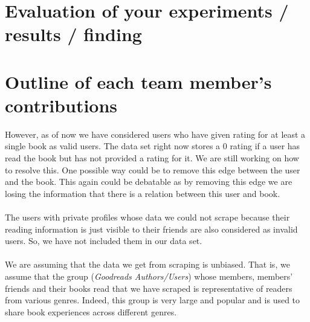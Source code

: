 \documentclass[11pt]{article}
\begin{document}
\section{Evaluation of your experiments / results / finding}
\section{Outline of each team member’s contributions}





However, as of now we have considered users who have given rating for at least a single book as valid users. The data set right now stores a 0 rating if a user has read the book but has not provided a rating for it. We are still working on how to resolve this. One possible way could be to remove this edge between the user and the book. This again could be debatable as by removing this edge we are losing the information that there is a relation between this user and book.\\\\
The users with private profiles whose data we could not scrape because their reading information is just visible to their friends are also considered as invalid users. So, we have not included them in our data set.\\\\
We are assuming that the data we get from scraping is unbiased. That is, we assume that the group ({\it Goodreads Authors/Users}) whose members, members' friends and their books read that we have scraped is representative of readers from various genres. Indeed, this group is very large and popular and is used to share book experiences across different genres.


\end{document}
